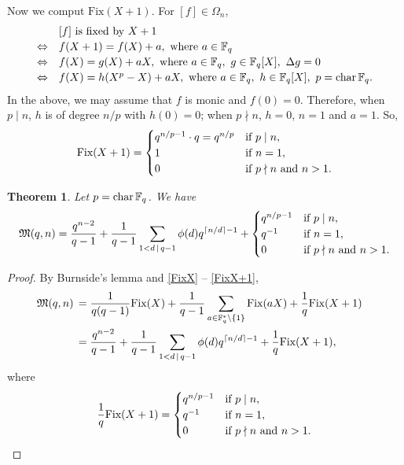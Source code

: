 \documentclass{amsart}
\newtheorem{thm}{Theorem}[section]
\numberwithin{equation}{section}
\theoremstyle{definition}
\newcommand{\f}{\Bbb F}
\begin{document}
\medskip
Now we comput $\text{Fix}(X+1)$. For $[f]\in\Omega_n$,
\[
\begin{array}{cl}
& \text{$[f]$ is fixed by $X+1$}\vspace{0.2em}\cr
\Leftrightarrow & f(X+1)=f(X)+a,\ \text{where}\ a\in\f_q \vspace{0.2em}\cr
\Leftrightarrow & f(X)=g(X)+aX,\ \text{where}\  a\in\f_q,\ g\in\f_q[X],\ \Delta g=0 \vspace{0.2em}\cr
\Leftrightarrow & f(X)=h(X^p-X)+aX,\ \text{where}\ a\in\f_q,\ h\in\f_q[X],\ p=\text{char}\,\f_q.
\end{array}
\]
In the above, we may assume that $f$ is monic and $f(0)=0$. Therefore,
when $p\mid n$, $h$ is of degree $n/p$ with $h(0)=0$; when $p\nmid n$, $h=0$, $n=1$ and $a=1$. So,
\begin{equation}\label{FixX+1}
\text{Fix}(X+1)=\begin{cases}
q^{n/p-1}\cdot q=q^{n/p}&\text{if}\ p\mid n,\cr
1&\text{if}\ n=1,\cr
0&\text{if $p\nmid n$ and $n>1$}.
\end{cases}
\end{equation}


\begin{thm}\label{T3.1}
Let $p=\text{\rm char}\,\f_q$. We have
\[
\frak M(q,n)=\frac{q^{n-2}}{q-1}+\frac 1{q-1}\sum_{1<d\,\mid\, q-1}\phi(d)q^{\lceil n/d\rceil-1}+\begin{cases}
q^{n/p-1}&\text{if}\ p\mid n,\cr
q^{-1}&\text{if}\ n=1,\cr
0&\text{if $p\nmid n$ and $n>1$}.
\end{cases}
\]
\end{thm}

\begin{proof}
By Burnside's lemma and \eqref{FixX} -- \eqref{FixX+1},
\begin{align*}
\frak M(q,n)\,&=\frac 1{q(q-1)}\text{Fix}(X)+\frac 1{q-1}\sum_{a\in\f_q^*\setminus\{1\}}\text{Fix}(aX)+\frac 1q\text{Fix}(X+1)\cr
&=\frac{q^{n-2}}{q-1}+\frac 1{q-1}\sum_{1<d\,\mid\, q-1}\phi(d)q^{\lceil n/d\rceil-1}+\frac 1q\text{Fix}(X+1),
\end{align*}
where
\[
\frac 1q\text{Fix}(X+1)=\begin{cases}
q^{n/p-1}&\text{if}\ p\mid n,\cr
q^{-1}&\text{if}\ n=1,\cr
0&\text{if $p\nmid n$ and $n>1$}.
\end{cases}
\]
\end{proof}
\end{document}
